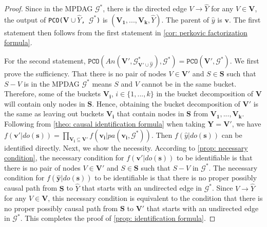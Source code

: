 \documentclass{article} %
\begin{document}
\begin{proof}
    Since in the MPDAG $\mathcal{G^*}$, there is the directed edge $V \rightarrow \hat{Y}$ for any $V \in \mathbf{V}$, the output of \texttt{PCO($\mathbf{V} \cup \hat{Y}$, $\mathcal{G^*}$)} is $(\mathbf{V_1,...,V_k}, \hat{Y})$. The parent of $\hat{y}$ is $\mathbf{v}$. The first statement then follows from the first statement in \cref{cor: perkovic factorization formula}.

    For the second statement, $\texttt{PCO} (An(\mathbf{V'}, \mathcal{G^{*}_{\mathbf{V'} \cup \hat{Y}}}), \mathcal{G^*}) = \texttt{PCO} (\mathbf{V'}, \mathcal{G^*})$. We first prove the sufficiency. That there is no pair of nodes $V \in \mathbf{V'}$ and $S \in \mathbf{S}$ such that $S-V$ is in the MPDAG $\mathcal{G^*}$ means $S$ and $V$ cannot be in the same bucket. Therefore, some of the buckets $\mathbf{V_i}$, $i \in \{1,...,k\}$ in the bucket decomposition of $\mathbf{V}$ will contain only nodes in $\mathbf{S}$. Hence, obtaining the bucket decomposition of $\mathbf{V'}$ is the same as leaving out buckets $\mathbf{V_i}$ that contain nodes in $\mathbf{S}$ from $\mathbf{V_1},..., \mathbf{V_k}$. Following from \cref{theo: causal identification formula} when taking $\mathbf{Y} = \mathbf{V'}$, we have $f(\mathbf{v'}|do(\mathbf{s})) 
        = \prod_{\mathbf{V_{i} \subseteq \mathbf{V'}}} f(\mathbf{v_i}|pa(\mathbf{v_i}, \mathcal{G^*}))$.
     Then $f(\hat{y}|do(\mathbf{s}))$ can be identified directly. 
     Next, we show the necessity. According to \cref{prop: necessary condition}, the necessary condition for $f(\mathbf{v'}|do(\mathbf{s}))$ to be identifiable is that there is no pair of nodes $V \in \mathbf{V'}$ and $S \in \mathbf{S}$ such that $S-V$ in $\mathcal{G^*}$. The necessary condition for $f(\mathbf{\hat{y}}|do(\mathbf{s}))$ to be identifiable is that there is no proper possibly causal path from $\mathbf{S}$ to $\hat{Y}$ that starts with an undirected edge in $\mathcal{G^*}$. Since $V \rightarrow \hat{Y}$ for any $V \in \mathbf{V}$, this necessary condition is equivalent to the condition that there is no proper possibly causal path from $\mathbf{S}$ to $\mathbf{V'}$ that starts with an undirected edge in $\mathcal{G^*}$. This completes the proof of \cref{prop: identification formula}.
\end{proof}
\end{document}
